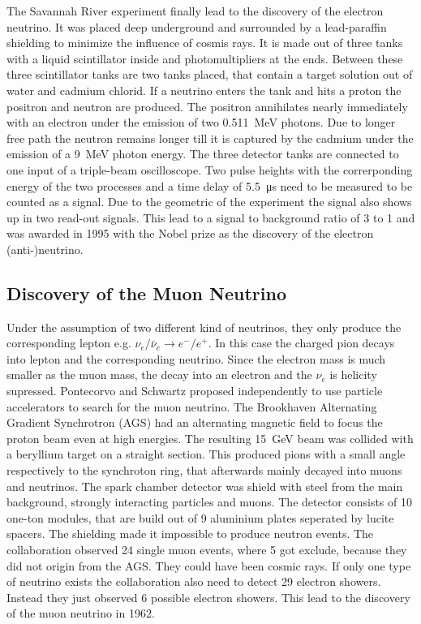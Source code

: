 The Savannah River experiment finally lead to the discovery of the electron neutrino. It was placed deep underground and surrounded by a lead-paraffin shielding to minimize the influence of cosmis rays. It is made out of three tanks with a liquid scintillator inside and photomultipliers at the ends. Between these three scintillator tanks are two tanks placed, that contain a target solution out of water and cadmium chlorid. If a neutrino enters the tank and hits a proton the positron and neutron are produced. The positron annihilates nearly immediately with an electron under the emission of two \SI{0.511}{\mega\electronvolt} photons. Due to longer free path the neutron remains longer till it is captured by the cadmium under the emission of a \SI{9}{\mega\electronvolt} photon energy. The three detector tanks are connected to one input of a triple-beam oscilloscope. Two pulse heights with the correrponding energy of the two processes and a time delay of \SI{5.5}{\micro\second} need to be measured to be counted as a signal. Due to the geometric of the experiment the signal also shows up in two read-out signals. This lead to a signal to background ratio of 3 to 1 and was awarded in 1995 with the Nobel prize as the discovery of the electron (anti-)neutrino.

\subsection{Discovery of the Muon Neutrino}
Under the assumption of two different kind of neutrinos, they only produce the corresponding lepton e.g. $\nu_{e}/\bar{\nu}_e \rightarrow e^{-}/e^{+}$. In this case the charged pion decays into lepton and the corresponding neutrino. Since the electron mass is much smaller as the muon mass, the decay into an electron and the $\nu_{e}$ is helicity supressed.
Pontecorvo and Schwartz proposed independently to use particle accelerators to search for the muon neutrino. The Brookhaven Alternating Gradient Synchrotron (AGS) had an alternating magnetic field to focus the proton beam even at high energies. The resulting \SI{15}{\giga\electronvolt} beam was collided with a beryllium target on a straight section. This produced pions with a small angle respectively to the synchroton ring, that afterwards mainly decayed into muons and neutrinos. The spark chamber detector was shield with steel from the main background, strongly interacting particles and muons. The detector consists of 10 one-ton modules, that are build out of 9 aluminium plates seperated by lucite spacers. The shielding made it impossible to produce neutron events. The collaboration observed 24 single muon events, where 5 got exclude, because they did not origin from the AGS. They could have been cosmic rays. If only one type of neutrino exists the collaboration also need to detect 29 electron showers. Instead they just observed 6 possible electron showers. This lead to the discovery of the muon neutrino in 1962.   

